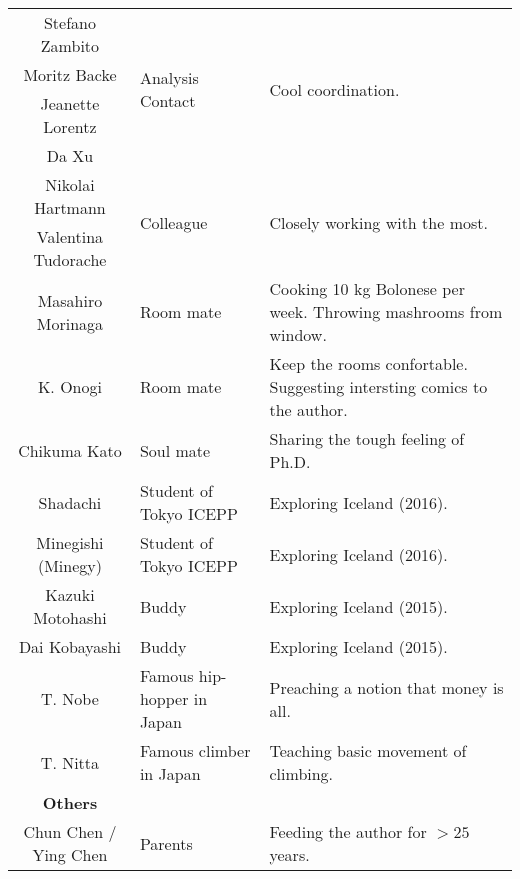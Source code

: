 \begin{table}[h]
\begin{tabularx}{\linewidth}{clX}
    Stefano Zambito    &   \multirow{4}{*}{Analysis Contact}         &  \multirow{4}{*}{Cool coordination.}   \\   
    Moritz Backe       &                            &     \\   
    Jeanette Lorentz   &            &     \\   
    Da Xu              &            &     \\   
    Nikolai Hartmann   &   \multirow{2}{*}{Colleague}                                         &  \multirow{2}{*}{Closely working with the most.}   \\   
    Valentina Tudorache&                                                                      &     \\   
    Masahiro Morinaga  &   Room mate                                                                      &  Cooking 10 kg Bolonese per week. Throwing mashrooms from window.   \\   
    K. Onogi           &   Room mate                                                                      &  Keep the rooms confortable. Suggesting intersting comics to the author.   \\   
    Chikuma Kato       &   Soul mate                                                                      &  Sharing the tough feeling of Ph.D.   \\   
    Shadachi           &   Student of Tokyo ICEPP                                                         &  Exploring Iceland (2016).   \\   
    Minegishi (Minegy) &   Student of Tokyo ICEPP                                                         &  Exploring Iceland (2016).   \\   
    Kazuki Motohashi   &   Buddy                                                                          &  Exploring Iceland (2015).   \\   
    Dai Kobayashi      &   Buddy                                                                          &  Exploring Iceland (2015).   \\   
    T. Nobe            &   Famous hip-hopper in Japan                                                     &  Preaching a notion that money is all.   \\   
    T. Nitta           &   Famous climber in Japan                                                        &  Teaching basic movement of climbing.   \\   
    \midrule
    \midrule
    \textbf{Others}     &               & \\
    \midrule
    Chun Chen / Ying Chen  &   Parents                                                 &  Feeding the author for $>25$ years.   \\       
    \bottomrule
  \end{tabularx}
\end{table}



